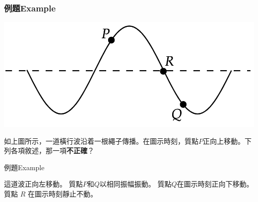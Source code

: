 \documentclass[beamer=true]{standalone}
\begin{document}
\begin{frame}
    \frametitle{例題Example}
    \par{\par\centering\includegraphics[width=.5\textwidth]{./img/ch1_2024-05-09-15-30-47.png}\par}
    如上圖所示，一道橫行波沿着一根繩子傳播。在圖示時刻，質點$P$正向上移動。下列各項敘述，那一項\textbf{不正確}？
\end{frame}

\begin{frame}[t]{例題Example}
    \begin{tasks}
        \task 這道波正向左移動。
        \task 質點$P$和$Q$以相同振幅振動。
        \task 質點$Q$在圖示時刻正向下移動。
        \task 質點 $R$ 在圖示時刻靜止不動。
    \end{tasks}
\end{frame}
\end{document}
